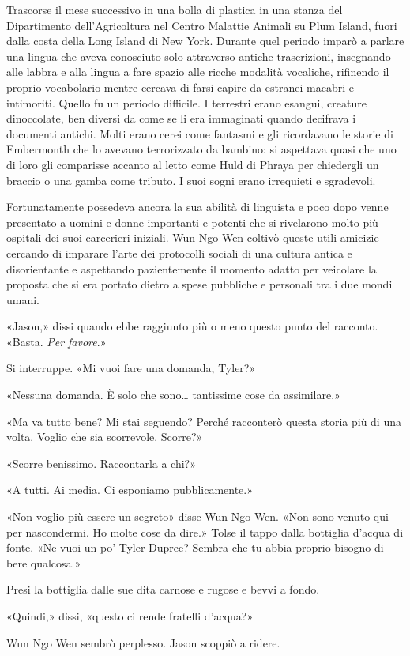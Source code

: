 Trascorse il mese successivo in una bolla di plastica in una stanza del
Dipartimento dell'Agricoltura nel Centro Malattie Animali su Plum
Island, fuori dalla costa della Long Island di New York. Durante quel
periodo imparò a parlare una lingua che aveva conosciuto solo attraverso
antiche trascrizioni, insegnando alle labbra e alla lingua a fare spazio
alle ricche modalità vocaliche, rifinendo il proprio vocabolario mentre
cercava di farsi capire da estranei macabri e intimoriti. Quello fu un
periodo difficile. I terrestri erano esangui, creature dinoccolate, ben
diversi da come se li era immaginati quando decifrava i documenti
antichi. Molti erano cerei come fantasmi e gli ricordavano le storie di
Embermonth che lo avevano terrorizzato da bambino: si aspettava quasi
che uno di loro gli comparisse accanto al letto come Huld di Phraya per
chiedergli un braccio o una gamba come tributo. I suoi sogni erano
irrequieti e sgradevoli.

Fortunatamente possedeva ancora la sua abilità di linguista e poco dopo
venne presentato a uomini e donne importanti e potenti che si rivelarono
molto più ospitali dei suoi carcerieri iniziali. Wun Ngo Wen coltivò
queste utili amicizie cercando di imparare l'arte dei protocolli sociali
di una cultura antica e disorientante e aspettando pazientemente il
momento adatto per veicolare la proposta che si era portato dietro a
spese pubbliche e personali tra i due mondi umani.

\separatorefiori

«Jason,» dissi quando ebbe raggiunto più o meno questo punto del
racconto. «Basta. \emph{Per favore}.»

Si interruppe. «Mi vuoi fare una domanda, Tyler?»

«Nessuna domanda. È solo che sono\ldots{} tantissime cose da
assimilare.»

«Ma va tutto bene? Mi stai seguendo? Perché racconterò questa storia più
di una volta. Voglio che sia scorrevole. Scorre?»

«Scorre benissimo. Raccontarla a chi?»

«A tutti. Ai media. Ci esponiamo pubblicamente.»

«Non voglio più essere un segreto» disse Wun Ngo Wen. «Non sono venuto
qui per nascondermi. Ho molte cose da dire.» Tolse il tappo dalla
bottiglia d'acqua di fonte. «Ne vuoi un po' Tyler Dupree? Sembra che tu
abbia proprio bisogno di bere qualcosa.»

Presi la bottiglia dalle sue dita carnose e rugose e bevvi a fondo.

«Quindi,» dissi, «questo ci rende fratelli d'acqua?»

Wun Ngo Wen sembrò perplesso. Jason scoppiò a ridere.